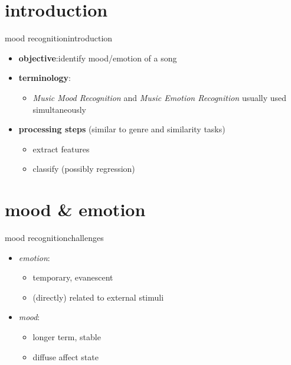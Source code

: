     \section[intro]{introduction}
        \begin{frame}{mood recognition}{introduction}
            
            \begin{itemize}
                \item	\textbf{objective}:identify mood/emotion of a song
                \item<2->   \textbf{terminology}:
                    \begin{itemize}
                        \item \textit{Music Mood Recognition} and \textit{Music Emotion Recognition} usually used simultaneously
                    \end{itemize}
                \bigskip
                \item<3->   \textbf{processing steps} (similar to genre and similarity tasks)
                    \begin{itemize}
                        \item   extract features
                        \item   classify (possibly regression)
                    \end{itemize}
            \end{itemize}
        \end{frame}
   
    \section[mood]{mood \& emotion}
        \begin{frame}{mood recognition}{challenges}
            \begin{itemize}
                \item	\textit{emotion}: 
                    \begin{itemize}
                        \item   temporary, evanescent
                        \item   (directly) related to external stimuli
                    \end{itemize}
                \item	\textit{mood}: 
                    \begin{itemize}
                        \item   longer term, stable
                        \item   diffuse affect state
                    \end{itemize}
            \end{itemize}
        \end{frame}
            
